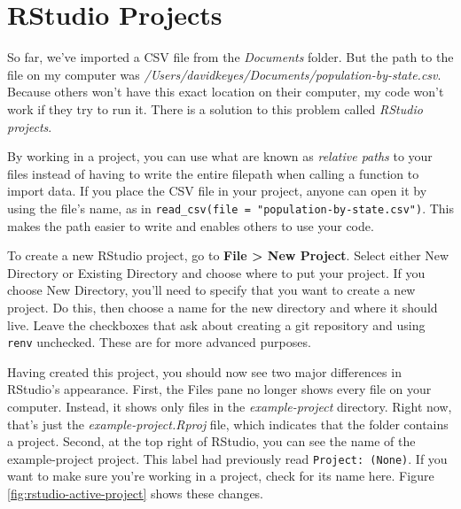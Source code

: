 \documentclass[
]{book}
\begin{document}
\hypertarget{rstudio-projects}{%
\section*{RStudio Projects}\label{rstudio-projects}}

So far, we've imported a CSV file from the \emph{Documents} folder. But the path to the file on my computer was \emph{/Users/davidkeyes/Documents/population-by-state.csv}. Because others won't have this exact location on their computer, my code won't work if they try to run it. There is a solution to this problem called \emph{RStudio projects}.

By working in a project, you can use what are known as \emph{relative paths} to your files instead of having to write the entire filepath when calling a function to import data. If you place the CSV file in your project, anyone can open it by using the file's name, as in \texttt{read\_csv(file\ =\ "population-by-state.csv")}. This makes the path easier to write and enables others to use your code.

To create a new RStudio project, go to \textbf{File \textgreater{} New Project}. Select either New Directory or Existing Directory and choose where to put your project. If you choose New Directory, you'll need to specify that you want to create a new project. Do this, then choose a name for the new directory and where it should live. Leave the checkboxes that ask about creating a git repository and using \texttt{renv} unchecked. These are for more advanced purposes.

Having created this project, you should now see two major differences in RStudio's appearance. First, the Files pane no longer shows every file on your computer. Instead, it shows only files in the \emph{example-project} directory. Right now, that's just the \emph{example-project.Rproj} file, which indicates that the folder contains a project. Second, at the top right of RStudio, you can see the name of the example-project project. This label had previously read \texttt{Project:\ (None)}. If you want to make sure you're working in a project, check for its name here. Figure \ref{fig:rstudio-active-project} shows these changes.
\end{document}
